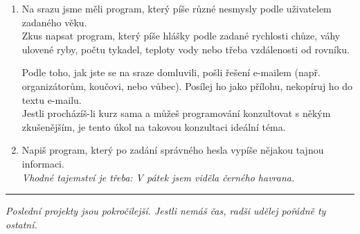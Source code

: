 \documentclass[a4paper,10pt]{article}
\newcommand\startsection[1]{
     \vspace{0.2ex}
    \hrule
    {\fontspec{Oxygen} \tiny
     \vspace{-1ex}
     \emph{#1}
     \vspace{-1.5em}
    }
}
\begin{document}
\begin{enumerate}[resume]

\item Na srazu jsme měli program, který píše různé nesmysly podle uživatelem zadaného věku.
    \\Zkus napsat program, který píše hlášky podle zadané
    rychlosti chůze, váhy ulovené ryby, počtu tykadel, teploty vody
    nebo třeba vzdálenosti od rovníku.

    Podle toho, jak jste se na sraze domluvili, pošli řešení e-mailem
    (např. organizátorům, koučovi, nebo vůbec).
    Posílej ho jako přílohu, nekopíruj ho do textu e-mailu.
    \\Jestli procházíš-li kurz sama a můžeš programování konzultovat s někým
    zkušenějším, je tento úkol na takovou konzultaci ideální téma.

\item Napiš program, který po zadání správného hesla vypíše nějakou tajnou informaci.
    \\\emph{\small Vhodné tajemství je třeba: V pátek jsem viděla černého havrana.}

\end{enumerate}

\startsection{Poslední projekty jsou pokročilejší.
Jestli nemáš čas, radši udělej pořádně ty ostatní.}
\end{document}
